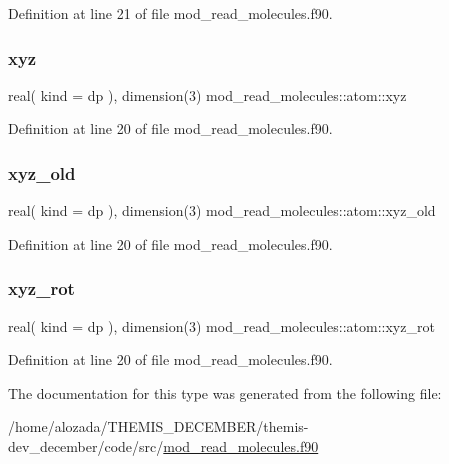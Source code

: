 Definition at line 21 of file mod\+\_\+read\+\_\+molecules.\+f90.

\mbox{\label{structmod__read__molecules_1_1atom_a8ecbd0d9a907569fc1b2992c429ff117}} 
\subsubsection{\texorpdfstring{xyz}{xyz}}
{\footnotesize\ttfamily real( kind = dp ), dimension(3) mod\+\_\+read\+\_\+molecules\+::atom\+::xyz}



Definition at line 20 of file mod\+\_\+read\+\_\+molecules.\+f90.

\mbox{\label{structmod__read__molecules_1_1atom_a87a78505ecd1a9c336b99a5904a9c1a4}} 
\subsubsection{\texorpdfstring{xyz\+\_\+old}{xyz\_old}}
{\footnotesize\ttfamily real( kind = dp ), dimension(3) mod\+\_\+read\+\_\+molecules\+::atom\+::xyz\+\_\+old}



Definition at line 20 of file mod\+\_\+read\+\_\+molecules.\+f90.

\mbox{\label{structmod__read__molecules_1_1atom_a352f7c34ce08e0bc6f3158c2ed13989f}} 
\subsubsection{\texorpdfstring{xyz\+\_\+rot}{xyz\_rot}}
{\footnotesize\ttfamily real( kind = dp ), dimension(3) mod\+\_\+read\+\_\+molecules\+::atom\+::xyz\+\_\+rot}



Definition at line 20 of file mod\+\_\+read\+\_\+molecules.\+f90.



The documentation for this type was generated from the following file\+:\begin{DoxyCompactItemize}
\item 
/home/alozada/\+T\+H\+E\+M\+I\+S\+\_\+\+D\+E\+C\+E\+M\+B\+E\+R/themis-\/dev\+\_\+december/code/src/\hyperlink{mod__read__molecules_8f90}{mod\+\_\+read\+\_\+molecules.\+f90}\end{DoxyCompactItemize}
